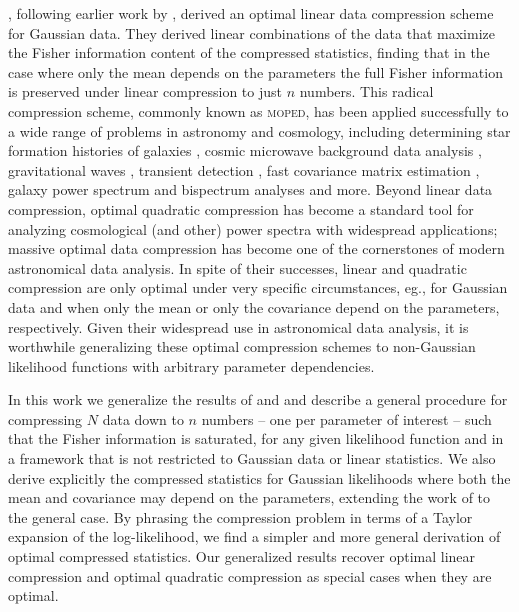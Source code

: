 \documentclass[fleqn,usenatbib]{mnras}
\begin{document}
\citet{Heavens2000a}, following earlier work by \citet{Tegmark1997}, derived an optimal linear data compression scheme for Gaussian data. They derived linear combinations of the data that maximize the Fisher information content of the compressed statistics, finding that in the case where only the mean depends on the parameters the full Fisher information is preserved under linear compression to just $n$ numbers. This radical compression scheme, commonly known as \textsc{moped}, has been applied successfully to a wide range of problems in astronomy and cosmology, including determining star formation histories of galaxies \citep{Reichardt2001, Heavens2004, Panter2007}, cosmic microwave background data analysis \citep{Gupta2002,Zablocki2016}, gravitational waves \citep{Graff2011}, transient detection \citep{Protopapas2005}, fast covariance matrix estimation \citep{Heavens2017}, galaxy power spectrum and bispectrum analyses \citep{Gualdi2017} and more. Beyond linear data compression, optimal quadratic compression has become a standard tool for analyzing cosmological (and other) power spectra \citep{Tegmark1997, Bond1998, Bond2000} with widespread applications; massive optimal data compression has become one of the cornerstones of modern astronomical data analysis. In spite of their successes, linear and quadratic compression are only optimal under very specific circumstances, eg., for Gaussian data and when only the mean or only the covariance depend on the parameters, respectively. Given their widespread use in astronomical data analysis, it is worthwhile generalizing these optimal compression schemes to non-Gaussian likelihood functions with arbitrary parameter dependencies.

In this work we generalize the results of \citet{Tegmark1997} and \citet{Heavens2000a} and describe a general procedure for compressing $N$ data down to $n$ numbers -- one per parameter of interest -- such that the Fisher information is saturated, for any given likelihood function and in a framework that is not restricted to Gaussian data or linear statistics. We also derive explicitly the compressed statistics for Gaussian likelihoods where both the mean and covariance may depend on the parameters, extending the work of \citet{Heavens2000a} to the general case. By phrasing the compression problem in terms of a Taylor expansion of the log-likelihood, we find a simpler and more general derivation of optimal compressed statistics. Our generalized results recover optimal linear compression \citep{Heavens2000a} and optimal quadratic compression \citep{1997PhRvD..55.5895T,Bond1998,Bond2000} as special cases when they are optimal.
\end{document}
